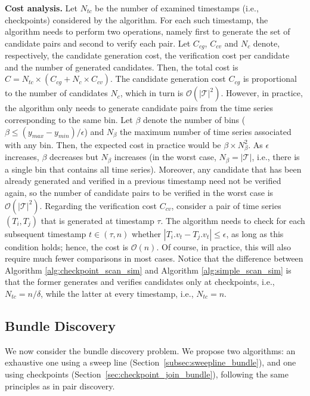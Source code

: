 \textbf{Cost analysis.} Let $N_{tc}$ be the number of examined timestamps (i.e., checkpoints) considered by the algorithm. For each such timestamp, the algorithm needs to perform two operations, namely first to generate the set of candidate pairs and second to verify each pair. Let $C_{cg}$, $C_{cv}$ and $N_c$ denote, respectively, the candidate generation cost, the verification cost per candidate and the number of generated candidates. Then, the total cost is $C = N_{tc} \times (C_{cg} + N_c \times C_{cv})$. The candidate generation cost $C_{cg}$ is proportional to the number of candidates $N_c$, which in turn is $\mathcal{O}(|\mathcal{T}|^2)$. However, in practice, the algorithm only needs to generate candidate pairs from the time series corresponding to the same bin. Let $\beta$ denote the number of bins ($\beta \leq (y_{max} - y_{min}) / \epsilon$) and $N_{\beta}$ the maximum number of time series associated with any bin. Then, the expected cost in practice would be $\beta \times N_{\beta}^2$. As $\epsilon$ increases, $\beta$ decreases but $N_{\beta}$ increases (in the worst case, $N_{\beta} = |\mathcal{T}|$, i.e., there is a single bin that contains all time series). Moreover, any candidate that has been already generated and verified in a previous timestamp need not be verified again, so the number of candidate pairs to be verified in the worst case is $\mathcal{O}(|\mathcal{T}|^2)$. Regarding the verification cost $C_{cv}$, consider a pair of time series $(T_i, T_j)$ that is generated at timestamp $\tau$. The algorithm needs to check for each subsequent timestamp $t \in (\tau, n)$ whether $|T_i.v_{t} - T_j.v_{t}| \leq \epsilon$, as long as this condition holds; hence, the cost is $\mathcal{O}(n)$. Of course, in practice, this will also require much fewer comparisons in most cases. Notice that the difference between Algorithm \ref{alg:checkpoint_scan_sim} and Algorithm \ref{alg:simple_scan_sim} is that the former generates and verifies candidates only at checkpoints, i.e., $N_{tc} = n / \delta$, while the latter at every timestamp, i.e., $N_{tc} = n$.

\subsection{Bundle Discovery}
\label{subsec:local_sim_join_bundle}
We now consider the bundle discovery problem. We propose two algorithms: an exhaustive one using a sweep line (Section~\ref{subsec:sweepline_bundle}), and one using checkpoints (Section~\ref{sec:checkpoint_join_bundle}), following the same principles as in pair discovery.

